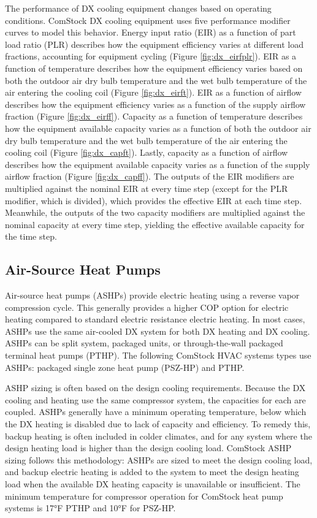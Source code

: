The performance of DX cooling equipment changes based on operating conditions. ComStock DX cooling equipment uses five performance modifier curves to model this behavior. Energy input ratio (EIR) as a function of part load ratio (PLR) describes how the equipment efficiency varies at different load fractions, accounting for equipment cycling (Figure  \ref{fig:dx_eirfplr}). EIR as a function of temperature describes how the equipment efficiency varies based on both the outdoor air dry bulb temperature and the wet bulb temperature of the air entering the cooling coil (Figure \ref{fig:dx_eirft}). EIR as a function of airflow describes how the equipment efficiency varies as a function of the supply airflow fraction (Figure \ref{fig:dx_eirff}). Capacity as a function of temperature describes how the equipment available capacity varies as a function of both the outdoor air dry bulb temperature and the wet bulb temperature of the air entering the cooling coil (Figure \ref{fig:dx_capft}). Lastly, capacity as a function of airflow describes how the equipment available capacity varies as a function of the supply airflow fraction (Figure \ref{fig:dx_capff}). The outputs of the EIR modifiers are multiplied against the nominal EIR at every time step (except for the PLR modifier, which is divided), which provides the effective EIR at each time step. Meanwhile, the outputs of the two capacity modifiers are multiplied against the nominal capacity at every time step, yielding the effective available capacity for the time step.


\subsection{Air-Source Heat Pumps}

Air-source heat pumps (ASHPs) provide electric heating using a reverse vapor compression cycle. This generally provides a higher COP option for electric heating compared to standard electric resistance electric heating. In most cases, ASHPs use the same air-cooled DX system for both DX heating and DX cooling. ASHPs can be split system, packaged units, or through-the-wall packaged terminal heat pumps (PTHP). The following ComStock HVAC systems types use ASHPs: packaged single zone heat pump (PSZ-HP) and PTHP.

ASHP sizing is often based on the design cooling requirements. Because the DX cooling and heating use the same compressor system, the capacities for each are coupled. ASHPs generally have a minimum operating temperature, below which the DX heating is disabled due to lack of capacity and efficiency. To remedy this, backup heating is often included in colder climates, and for any system where the design heating load is higher than the design cooling load. ComStock ASHP sizing follows this methodology: ASHPs are sized to meet the design cooling load, and backup electric heating is added to the system to meet the design heating load when the available DX heating capacity is unavailable or insufficient. The minimum temperature for compressor operation for ComStock heat pump systems is 17°F PTHP and 10°F for PSZ-HP.



